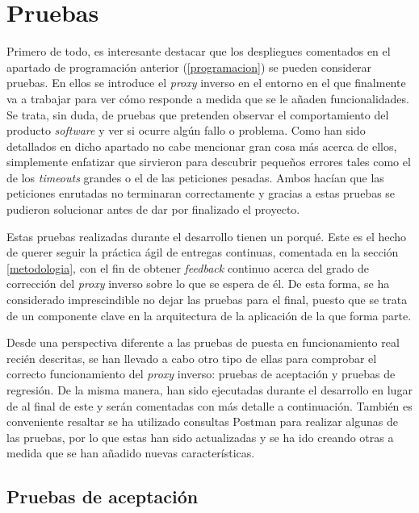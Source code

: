 \documentclass[11pt,spanish,listoffigures]{tfgetsinf}
\begin{document}

	\section{Pruebas} \label{pruebas}

Primero de todo, es interesante destacar que los despliegues comentados en el apartado de programación anterior (\ref{programacion}) se pueden considerar pruebas. En ellos se introduce el \emph{proxy} inverso en el entorno en el que finalmente va a trabajar para ver cómo responde a medida que se le añaden funcionalidades. Se trata, sin duda, de pruebas que pretenden observar el comportamiento del producto \emph{software} y ver si ocurre algún fallo o problema. Como han sido detallados en dicho apartado no cabe mencionar gran cosa más acerca de ellos, simplemente enfatizar que sirvieron para descubrir pequeños errores tales como el de los \emph{timeouts} grandes o el de las peticiones pesadas. Ambos hacían que las peticiones enrutadas no terminaran correctamente y gracias a estas pruebas se pudieron solucionar antes de dar por finalizado el proyecto.

Estas pruebas realizadas durante el desarrollo tienen un porqué. Este es el hecho de querer seguir la práctica ágil de entregas continuas, comentada en la sección \ref{metodologia}, con el fin de obtener \emph{feedback} continuo acerca del grado de corrección del \emph{proxy} inverso sobre lo que se espera de él. De esta forma, se ha considerado imprescindible no dejar las pruebas para el final, puesto que se trata de un componente clave en la arquitectura de la aplicación de la que forma parte.

Desde una perspectiva diferente a las pruebas de puesta en funcionamiento real recién descritas, se han llevado a cabo otro tipo de ellas para comprobar el correcto funcionamiento del \emph{proxy} inverso: pruebas de aceptación y pruebas de regresión. De la misma manera, han sido ejecutadas durante el desarrollo en lugar de al final de este y serán comentadas con más detalle a continuación. También es conveniente resaltar se ha utilizado consultas Postman para realizar algunas de las pruebas, por lo que estas han sido actualizadas y se ha ido creando otras a medida que se han añadido nuevas características.


		\subsection{Pruebas de aceptación} \label{pruebasDeAceptacion}
\end{document}
